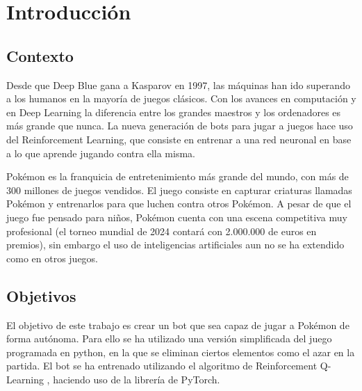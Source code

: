 \chapter{Introducción}

\section{Contexto}

Desde que Deep Blue gana a Kasparov en 1997, las máquinas han ido superando a los humanos en la mayoría de juegos clásicos. Con los avances en computación y en Deep Learning la diferencia entre los grandes maestros y los ordenadores es más grande que nunca. La nueva generación de bots para jugar a juegos hace uso del Reinforcement Learning, que consiste en entrenar a una red neuronal en base a lo que aprende jugando contra ella misma.

Pokémon es la franquicia de entretenimiento más grande del mundo, con más de 300 millones de juegos vendidos. El juego consiste en capturar criaturas llamadas Pokémon y entrenarlos para que luchen contra otros Pokémon. A pesar de que el juego fue pensado para niños, Pokémon cuenta con una escena competitiva muy profesional (el torneo mundial de 2024 contará con 2.000.000 de euros en premios), sin embargo el uso de inteligencias artificiales aun no se ha extendido como en otros juegos.

\section{Objetivos}

El objetivo de este trabajo es crear un bot que sea capaz de jugar a Pokémon de forma autónoma. Para ello se ha utilizado una versión simplificada del juego programada en python, en la que se eliminan ciertos elementos como el azar en la partida. El bot se ha entrenado utilizando el algoritmo de Reinforcement Q-Learning , haciendo uso de la librería de PyTorch.


